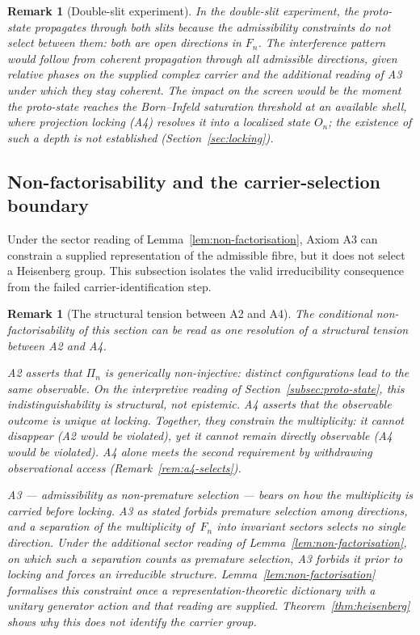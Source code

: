 \documentclass[11pt,a4paper]{article}
\newtheorem{remark}[theorem]{Remark}
\begin{document}
    \begin{remark}[Double-slit experiment]
  In the double-slit experiment, the proto-state propagates through both slits
  because the admissibility constraints do not select between them:
  both are open directions in $F_n$.
  The interference pattern would follow from coherent propagation through all admissible directions, given
  relative phases on the supplied complex carrier and the additional reading of A3 under which they stay
  coherent.
  The impact on the screen would be the moment the proto-state reaches the
  Born--Infeld saturation threshold at an available shell, where projection locking (A4)
  resolves it into a localized state $O_n$; the existence of such a depth is not established
  (Section~\ref{sec:locking}).
    \end{remark}

  \subsection{Non-factorisability and the carrier-selection boundary}
    \label{subsec:heisenberg}

    Under the sector reading of Lemma~\ref{lem:non-factorisation}, Axiom A3 can constrain a supplied
    representation of the admissible fibre, but it does not select a Heisenberg group.
    This subsection isolates the valid irreducibility consequence from the failed
    carrier-identification step.

    \begin{remark}[The structural tension between A2 and A4]
      \label{rem:a2-a4-tension}
      The conditional non-factorisability of this section can be read as one resolution of a structural
      tension between A2 and A4.

      A2 asserts that $\Pi_n$ is generically non-injective: distinct configurations lead to the same
      observable.
      On the interpretive reading of Section~\ref{subsec:proto-state}, this indistinguishability is
      structural, not epistemic.
      A4 asserts that the observable outcome is unique at locking.
      Together, they constrain the multiplicity: it cannot disappear (A2 would be violated), yet it cannot
      remain directly observable (A4 would be violated).
      A4 alone meets the second requirement by withdrawing observational access
      (Remark~\ref{rem:a4-selects}).

      A3 --- admissibility as non-premature selection --- bears on how the multiplicity is carried before
      locking.
      A3 as stated forbids premature selection among directions, and a separation of the multiplicity of~$F_n$
      into invariant sectors selects no single direction.
      Under the additional sector reading of Lemma~\ref{lem:non-factorisation}, on which such a separation
      counts as premature selection, A3 forbids it prior to locking and forces an irreducible structure.
      Lemma~\ref{lem:non-factorisation} formalises this constraint once a representation-theoretic
      dictionary with a unitary generator action and that reading are supplied.
      Theorem~\ref{thm:heisenberg} shows why this does not identify the carrier
      group.
    \end{remark}
\end{document}
